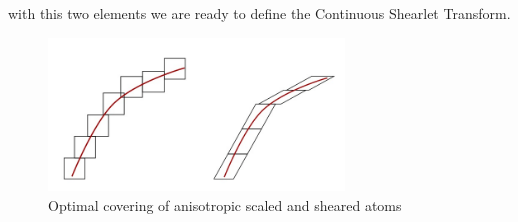 with this two elements we are ready to define the Continuous Shearlet Transform.

\begin{figure}[h!]
\centering
\includegraphics[width = 0.7\textwidth]{./Diagrams/anisotropic_isotropic.jpg}
\caption{Optimal covering of anisotropic scaled and sheared atoms}
\label{edges-images}
\end{figure}

